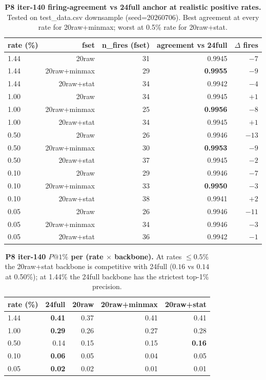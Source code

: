 \documentclass{article}
\begin{document}
\begin{table}[h]
\centering
\caption{\textbf{P8 iter-140 firing-agreement vs 24full anchor at
realistic positive rates.}  Tested on test\_data.csv
downsample (seed=20260706).  Best agreement at every rate for
20raw+minmax; worst at 0.5\% rate for 20raw+stat.}
\label{tab:p8-iter140-firing-agreement}
\small
\begin{tabular}{lrrrr}
\toprule
rate (\%) & fset & n\_fires (fset) & agreement vs 24full & $\Delta$ fires \\
\midrule
1.44 & 20raw & 31 & 0.9945 & $-7$ \\
1.44 & 20raw+minmax & 29 & \textbf{0.9955} & $-9$ \\
1.44 & 20raw+stat  & 34 & 0.9942 & $-4$ \\
1.00 & 20raw & 34 & 0.9945 & $+1$ \\
1.00 & 20raw+minmax & 25 & \textbf{0.9956} & $-8$ \\
1.00 & 20raw+stat  & 34 & 0.9945 & $+1$ \\
0.50 & 20raw & 26 & 0.9946 & $-13$ \\
0.50 & 20raw+minmax & 30 & \textbf{0.9953} & $-9$ \\
0.50 & 20raw+stat  & 37 & 0.9945 & $-2$ \\
0.10 & 20raw & 29 & 0.9946 & $-7$ \\
0.10 & 20raw+minmax & 33 & \textbf{0.9950} & $-3$ \\
0.10 & 20raw+stat  & 38 & 0.9941 & $+2$ \\
0.05 & 20raw & 26 & 0.9946 & $-11$ \\
0.05 & 20raw+minmax & 34 & 0.9946 & $-3$ \\
0.05 & 20raw+stat  & 36 & 0.9942 & $-1$ \\
\bottomrule
\end{tabular}
\end{table}

\begin{table}[h]
\centering
\caption{\textbf{P8 iter-140 $P@1\%$ per (rate $\times$ backbone).}
At rates $\le 0.5\%$ the 20raw+stat backbone is competitive with
24full ($0.16$ vs $0.14$ at 0.50\%); at 1.44\% the 24full backbone
has the strictest top-1\% precision.}
\label{tab:p8-iter140-p-at-1}
\small
\begin{tabular}{lrrrr}
\toprule
rate (\%) & 24full & 20raw & 20raw+minmax & 20raw+stat \\
\midrule
1.44 & \textbf{0.41} & 0.37 & 0.41 & 0.41 \\
1.00 & \textbf{0.29} & 0.26 & 0.27 & 0.28 \\
0.50 & 0.14 & 0.15 & 0.15 & \textbf{0.16} \\
0.10 & \textbf{0.06} & 0.05 & 0.04 & 0.05 \\
0.05 & \textbf{0.02} & 0.02 & 0.01 & 0.01 \\
\bottomrule
\end{tabular}
\end{table}
\end{document}
